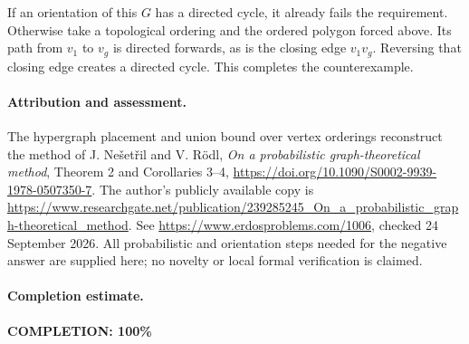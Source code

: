 If an orientation of this \(G\) has a directed cycle, it already fails the requirement. Otherwise take a topological ordering and the ordered polygon forced above. Its path from \(v_1\) to \(v_g\) is directed forwards, as is the closing edge \(v_1v_g\). Reversing that closing edge creates a directed cycle. This completes the counterexample.

\paragraph{Attribution and assessment.}
The hypergraph placement and union bound over vertex orderings reconstruct the method of J. Ne\v{s}et\v{r}il and V. R\"odl, \emph{On a probabilistic graph-theoretical method}, Theorem 2 and Corollaries 3--4, \url{https://doi.org/10.1090/S0002-9939-1978-0507350-7}. The author's publicly available copy is \url{https://www.researchgate.net/publication/239285245_On_a_probabilistic_graph-theoretical_method}. See \url{https://www.erdosproblems.com/1006}, checked 24 September 2026. All probabilistic and orientation steps needed for the negative answer are supplied here; no novelty or local formal verification is claimed.

\paragraph{Completion estimate.}
\textbf{COMPLETION: 100\%}
